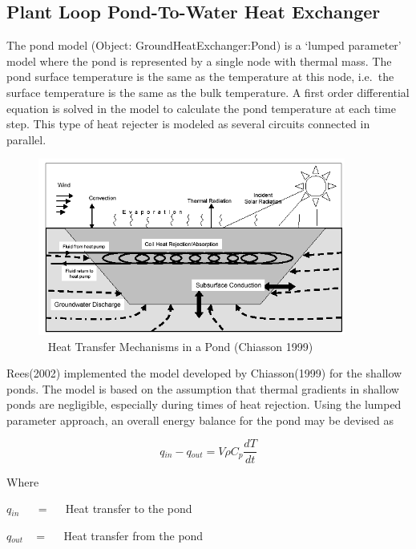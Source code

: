 \subsection{Plant Loop Pond-To-Water Heat Exchanger}\label{plant-loop-pond-to-water-heat-exchanger}

The pond model (Object: GroundHeatExchanger:Pond) is a `lumped parameter' model where the pond is represented by a single node with thermal mass. The pond surface temperature is the same as the temperature at this node, i.e.~the surface temperature is the same as the bulk temperature. A first order differential equation is solved in the model to calculate the pond temperature at each time step. This type of heat rejecter is modeled as several circuits connected in parallel.

\begin{figure}[hbtp] %
\centering
\includegraphics[width=0.9\textwidth, height=0.9\textheight, keepaspectratio=true]{media/image5676.png}
\caption{  Heat Transfer Mechanisms in a Pond (Chiasson 1999) \protect \label{fig:heat-transfer-mechanisms-in-a-pond-chiasson}}
\end{figure}

Rees(2002) implemented the model developed by Chiasson(1999) for the shallow ponds. The model is based on the assumption that thermal gradients in shallow ponds are negligible, especially during times of heat rejection. Using the lumped parameter approach, an overall energy balance for the pond may be devised as

\begin{equation}
q{}_{in} - q{}_{out} = V\rho C{}_p\frac{{dT}}{{dt}}
\end{equation}

Where

\(q{}_{in}\) ~~ = ~~ Heat transfer to the pond

\(q{}_{out}\) ~ = ~~ Heat transfer from the pond

